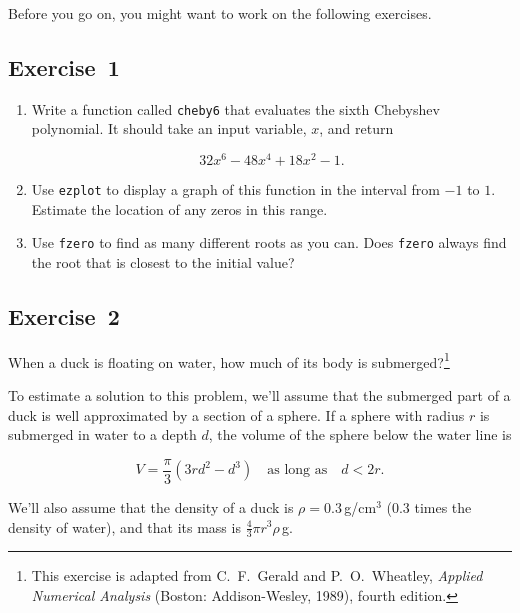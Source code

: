 Before you go on, you might want to work on the following exercises.

\subsection{Exercise~1}

\begin{enumerate}


\item Write a function called \lstinline{cheby6} that evaluates the
sixth Chebyshev polynomial.  It should take an input variable,
$x$, and return

\begin{equation*}
32 x^6 - 48 x^4 + 18 x^2 - 1 .
\end{equation*}

\item Use \lstinline{ezplot} to display a graph of this function in the
interval from $-1$ to $1$.  Estimate the location of any zeros in this
range.

\item Use \lstinline{fzero} to find as many different roots as you can.
Does \lstinline{fzero} always find the root that is closest to the initial
value?

\end{enumerate}



\subsection{Exercise~2}
\label{duck}

When a duck is floating on water, how much of its body is submerged?\footnote{This exercise is adapted from C.~F.~Gerald and P.~O.~Wheatley, {\em Applied Numerical Analysis} (Boston: Addison-Wesley, 1989), fourth edition.}


To estimate a solution to this problem, we'll assume that the submerged part of a duck is well approximated by a section of a sphere.
If a sphere with radius $r$ is submerged in water to a depth $d$, the
volume of the sphere below the water line is

\[ V = \frac{\pi}{3} (3r d^2 - d^3) \quad
\mbox{as long as} \quad d < 2 r.  \]

We'll also assume that the density of a duck is $\rho = 0.3$\,g/cm$^3$ (0.3 times the density of water), and that its mass is $\frac{4}{3} \pi r^3 \rho$\,g.


